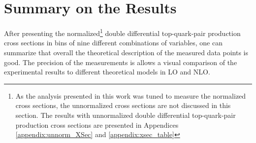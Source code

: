 %  
% 
% 
% 

\section{Summary on the Results}

After presenting the normalized\footnote{As the analysis presented in this work was tuned to measure the normalized cross sections, the unnormalized cross sections are not
discussed in this section. The results with unnormalized double differential top-quark-pair production cross sections are presented in Appendices \ref{appendix:unnorm_XSec}
and \ref{appendix:xsec_table}} double differential top-quark-pair production cross sections in bins of nine different combinations of variables,
one can summarize that overall the theoretical description of the measured data points is good. The precision of the measurements is allows a visual 
comparison of the experimental results to different theoretical models in LO and NLO.


